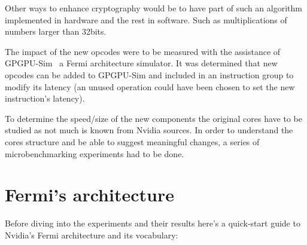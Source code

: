 \documentclass{report}
\begin{document}
    Other ways to enhance cryptography would be to have part of such
    an algorithm implemented in hardware and the rest in software.
    Such as multiplications of numbers larger than 32bits.
    

    The impact of the new opcodes were to be measured with the assistance of
    GPGPU-Sim~\cite{gpgpusim09} a Fermi architecture simulator. It was determined
    that new opcodes can be added to GPGPU-Sim and included in an instruction group
    to modify its latency (an unused operation could have been chosen to set the new
    instruction's latency).

    To determine the speed/size of the new components the original cores have to
    be studied as not much is known from Nvidia sources. In order to understand 
    the cores structure and be able to suggest meaningful changes, a series of microbenchmarking 
    experiments had to be done. 


\chapter{Fermi's architecture}
    Before diving into the experiments and their results here's a quick-start
    guide to Nvidia's Fermi architecture and its vocabulary:
\end{document}
